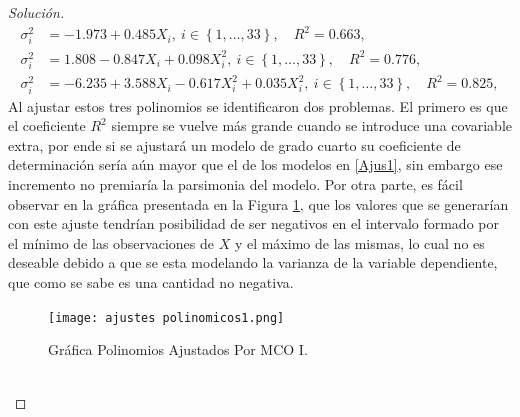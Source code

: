 \documentclass[10.5pt,notitlepage]{article}
\newenvironment{solucion}
  {\begin{proof}[Solución]}
  {\end{proof}}
\newcommand{\kis}[1]{\left\{ #1 \right\}}
\theoremstyle{plain}
\begin{document}
\begin{solucion}
\begin{align}\label{Ajus1}
     \sigma_i^{2} &= -1.973 + 0.485 X_i, \ i \in \kis{1, \hdots, 33}, \quad R^2 = 0.663,\nonumber \\ 
     \sigma_i^{2} &=  1.808 -0.847X_i + 0.098X_i^{2}, \ i\in\kis{1, \hdots, 33}, \quad R^2 =0.776,\nonumber \\ 
     \sigma_i^{2} &= -6.235+ 3.588X_i -0.617X_i^{2} + 0.035X_{i}^{2}, \ i\in\kis{1, \hdots, 33}, \quad R^2 =0.825, 
\end{align}
Al ajustar estos tres polinomios se identificaron dos problemas. El primero es que el coeficiente \(R^2\) siempre se vuelve más grande cuando se introduce una covariable extra, por ende si se ajustará un modelo de grado cuarto su coeficiente de determinación sería aún mayor que el de los modelos en \eqref{Ajus1}, sin embargo ese incremento no premiaría la parsimonia del modelo. Por otra parte, es fácil observar en la gráfica presentada en la Figura \ref{fig:7}, que los valores que se generarían con este ajuste tendrían posibilidad de ser negativos en el intervalo formado por el mínimo de las observaciones de \(X\) y el máximo de las mismas, lo cual no es deseable debido a que se esta modelando la varianza de la variable dependiente, que como se sabe es una cantidad no negativa.  
\begin{figure}[htb]
 \centering
 \texttt{[image: ajustes polinomicos1.png]}
 \caption{Gráfica Polinomios Ajustados Por MCO I.}
 \label{fig:7}
\end{figure}\\ 


\end{solucion}
\end{document}
